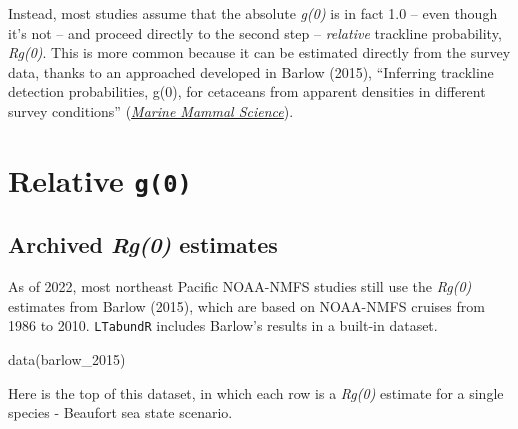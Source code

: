 \documentclass[
]{book}
\newenvironment{Shaded}{\begin{snugshade}}{\end{snugshade}}
\newcommand{\FunctionTok}[1]{\textcolor[rgb]{0.00,0.00,0.00}{#1}}
\newcommand{\NormalTok}[1]{#1}
\begin{document}
Instead, most studies assume that the absolute \emph{g(0)} is in fact 1.0 -- even though it's not -- and proceed directly to the second step -- \emph{relative} trackline probability, \emph{Rg(0)}. This is more common because it can be estimated directly from the survey data, thanks to an approached developed in Barlow (2015), ``Inferring trackline detection probabilities, g(0), for cetaceans from apparent densities in different survey conditions'' (\href{https://onlinelibrary.wiley.com/doi/abs/10.1111/mms.12205?casa_token=BuVMa8KCgQUAAAAA:iXIQxWBCnMaWWNlNTSQ5EC2LYmodDYGHs0r-pgIPNxOCLRZzf8xXZ3vDUOlUCZRptmDsztr0Hh4}{\emph{Marine Mammal Science}}).

\hypertarget{relative-g0}{%
\section*{\texorpdfstring{Relative \texttt{g(0)}}{Relative g(0)}}\label{relative-g0}}

\hypertarget{archived-rg0-estimates}{%
\subsection*{\texorpdfstring{Archived \emph{Rg(0)} estimates}{Archived Rg(0) estimates}}\label{archived-rg0-estimates}}

As of 2022, most northeast Pacific NOAA-NMFS studies still use the \emph{Rg(0)} estimates from Barlow (2015), which are based on NOAA-NMFS cruises from 1986 to 2010. \texttt{LTabundR} includes Barlow's results in a built-in dataset.

\begin{Shaded}
\begin{Highlighting}[]
\FunctionTok{data}\NormalTok{(barlow\_2015)}
\end{Highlighting}
\end{Shaded}

Here is the top of this dataset, in which each row is a \emph{Rg(0)} estimate for a single species - Beaufort sea state scenario.
\end{document}
